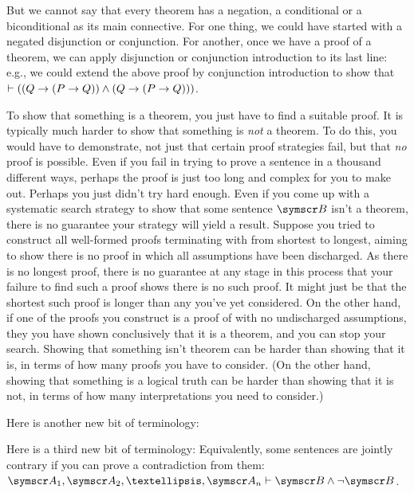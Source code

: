 But we cannot say that every theorem has a negation, a conditional or a biconditional as its main connective. For one thing, we could have started with a negated disjunction or conjunction. For another, once we have a proof of a theorem, we can apply disjunction or conjunction introduction to its last line: e.g., we could extend the above proof by conjunction introduction to show that $\vdash ((Q \to (P \to Q))\wedge (Q \to (P \to Q)))$. 



To show that something is a theorem, you just have to find a suitable proof. It is typically much harder to show that something is \emph{not} a theorem. To do this, you would have to demonstrate, not just that certain proof strategies fail, but that \emph{no} proof is possible. Even if you fail in trying to prove a sentence in a thousand different ways, perhaps the proof is just too long and complex for you to make out. Perhaps you just didn't try hard enough. Even if you come up with a systematic search strategy to show that some sentence $\meta{B}$ isn't a theorem, there is no guarantee your strategy will yield a result. Suppose you tried to construct all well-formed proofs terminating with  from shortest to longest, aiming to show there is no proof in which all assumptions have been discharged. As there is no longest proof, there is no guarantee at any stage in this process that your failure to find such a proof shows there is no such proof. It might just be that the shortest such proof is longer than any you've yet considered. On the other hand, if one of the proofs you construct is a proof of  with no undischarged assumptions, they you have shown conclusively that it is a theorem, and you can stop your search. Showing that something isn't theorem can be harder than showing that it is, in terms of how many proofs you have to consider. (On the other hand, showing that something is a logical truth can be harder than showing that it is not, in terms of how many interpretations you need to consider.)



Here is another new bit of terminology:

Here is a third new bit of terminology:
	 Equivalently, some sentences are jointly contrary if you can prove a contradiction from them: $\meta{A}_{1},\meta{A}_{2},…, \meta{A}_{n} \proves \meta{B}\eand\enot\meta{B}$. 

